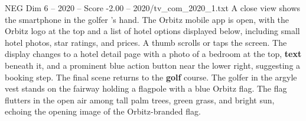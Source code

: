 \begin{textsample}{NEG Dim 6 – 2020 – Score -2.00 – 2020/tv\_com\_2020\_1.txt}
A close view shows the smartphone in the golfer ’s hand.
The Orbitz mobile app is open, with the Orbitz logo at the top and a list of hotel options displayed below, including small hotel photos, star ratings, and prices.
A thumb scrolls or taps the screen.
The display changes to a hotel detail page with a photo of a bedroom at the top, \textbf{text} beneath it, and a prominent blue action button near the lower right, suggesting a booking step.
The final scene returns to the \textbf{golf} course.
The golfer in the argyle vest stands on the fairway holding a flagpole with a blue Orbitz flag.
The flag flutters in the open air among tall palm trees, green grass, and bright sun, echoing the opening image of the Orbitz-branded flag.

\end{textsample}
